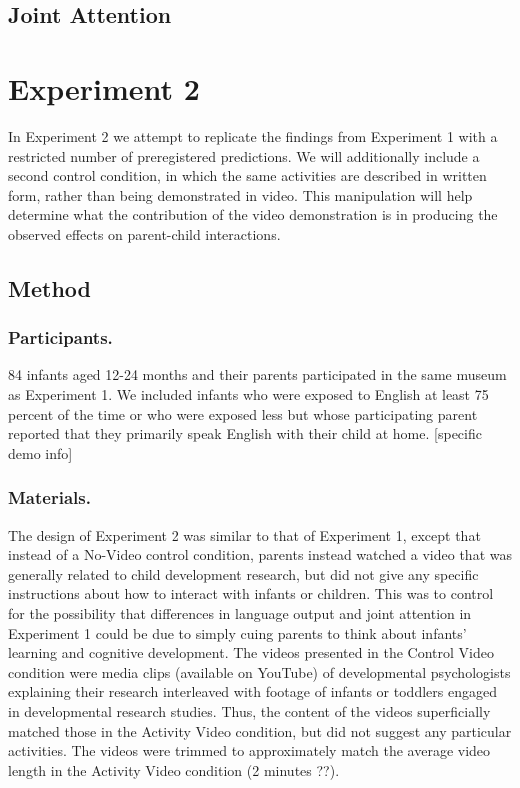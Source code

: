 \documentclass[10pt, letterpaper]{article}
\begin{document}
\subsection{Joint Attention}\label{joint-attention}

\section{Experiment 2}\label{experiment-2}

In Experiment 2 we attempt to replicate the findings from Experiment 1
with a restricted number of preregistered predictions. We will
additionally include a second control condition, in which the same
activities are described in written form, rather than being demonstrated
in video. This manipulation will help determine what the contribution of
the video demonstration is in producing the observed effects on
parent-child interactions.

\subsection{Method}\label{method-1}

\subsubsection{Participants.}\label{participants.-1}

84 infants aged 12-24 months and their parents participated in the same
museum as Experiment 1. We included infants who were exposed to English
at least 75 percent of the time or who were exposed less but whose
participating parent reported that they primarily speak English with
their child at home. {[}specific demo info{]}

\subsubsection{Materials.}\label{materials.-1}

The design of Experiment 2 was similar to that of Experiment 1, except
that instead of a No-Video control condition, parents instead watched a
video that was generally related to child development research, but did
not give any specific instructions about how to interact with infants or
children. This was to control for the possibility that differences in
language output and joint attention in Experiment 1 could be due to
simply cuing parents to think about infants' learning and cognitive
development. The videos presented in the Control Video condition were
media clips (available on YouTube) of developmental psychologists
explaining their research interleaved with footage of infants or
toddlers engaged in developmental research studies. Thus, the content of
the videos superficially matched those in the Activity Video condition,
but did not suggest any particular activities. The videos were trimmed
to approximately match the average video length in the Activity Video
condition (2 minutes ??).
\end{document}
